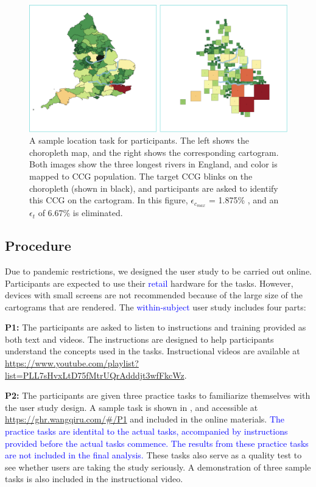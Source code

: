 \documentclass[Afour,sagev,times]{sagej}
\newcommand{\new}[1]{\textcolor{blue}{#1}}
\newcommand{\nodeError}{\epsilon}
\newcommand{\nodeCartographicErrorMax}{\nodeError_{c_{max}}}
\newcommand{\nodeTopologicalError}{\nodeError_{t}}
\begin{document}
    {
        \begin{figure}[tb!]
            \centering
            \includegraphics[width=\columnwidth,keepaspectratio]{task.png}
            \caption{A sample location task for participants.
                The left shows the choropleth map, and the right shows the corresponding cartogram.
                Both images show the three longest rivers in England, and color is mapped to CCG population.
                The target CCG blinks on the choropleth (shown in black), and participants are asked to identify this CCG on the cartogram.
                In this figure, $ \nodeCartographicErrorMax $ = 1.875\% , and an $ \nodeTopologicalError $ of 6.67\% is eliminated.
            }
            \label{fig:task}
        \end{figure}
    }

\subsection{Procedure}\label{subsec:{Procedure}}

Due to pandemic restrictions, we designed the user study to be carried out online.
Participants are expected to use their \new{retail} hardware for the tasks.
However, devices with small screens are not recommended because of the large size of the cartograms that are rendered.
The \new{within-subject} user study includes four parts:

\textbf{P1:} The participants are asked to listen to instructions and training provided as both text and videos.
The instructions are designed to help participants understand the concepts used in the tasks.
Instructional videos are available at \url{https://www.youtube.com/playlist?list=PLL7sHvxLtD75fMtrUQrAdddjt3wfFkcWz}.

\textbf{P2:} The participants are given three practice tasks to familiarize themselves with the user study design.
A sample task is shown in , and accessible at \url{https://ghr.wangqiru.com/#/P1} and included in the online materials\footnotemark{}.
\new{The practice tasks are identital to the actual tasks, accompanied by instructions provided before the actual tasks commence.
The results from these practice tasks are not included in the final analysis.}
These tasks also serve as a quality test to see whether users are taking the study seriously.
A demonstration of three sample tasks is also included in the instructional video.
\end{document}
